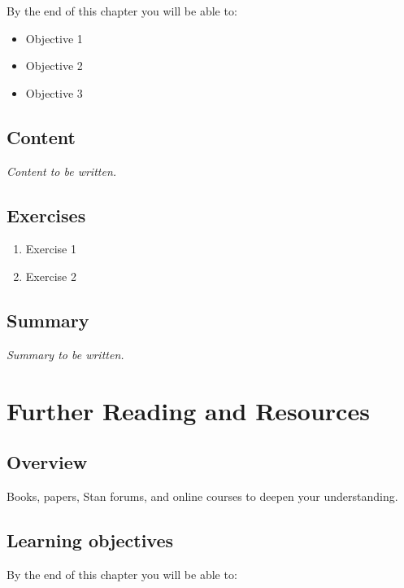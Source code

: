 \documentclass[
  11pt,
  a4paper,
  oneside,
  openany]{scrbook}
\providecommand{\tightlist}{%
  \setlength{\itemsep}{0pt}\setlength{\parskip}{0pt}}\usepackage{longtable,booktabs,array}
\begin{document}
By the end of this chapter you will be able to:

\begin{itemize}
\tightlist
\item[$\square$]
  Objective 1
\item[$\square$]
  Objective 2
\item[$\square$]
  Objective 3
\end{itemize}

\section{Content}\label{content-17}

\emph{Content to be written.}

\section{Exercises}\label{exercises-18}

\begin{enumerate}
\def\labelenumi{\arabic{enumi}.}
\tightlist
\item
  Exercise 1
\item
  Exercise 2
\end{enumerate}

\section{Summary}\label{summary-18}

\emph{Summary to be written.}

\chapter{Further Reading and
Resources}\label{further-reading-and-resources}

\section{Overview}\label{overview-19}

Books, papers, Stan forums, and online courses to deepen your
understanding.

\section{Learning objectives}\label{learning-objectives-19}

By the end of this chapter you will be able to:
\end{document}

